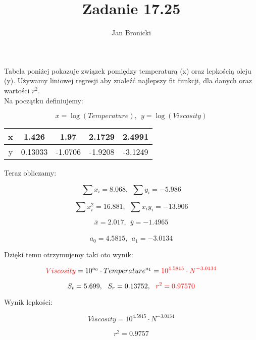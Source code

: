 \documentclass{article}
\title{Zadanie 17.25}
\author{Jan Bronicki}
\date{}
\begin{document}
\maketitle
Tabela poniżej pokazuje związek pomiędzy temperaturą (x) oraz lepkością oleju (y). Używamy liniowej regresji aby znaleźć najlepszy fit funkcji, dla danych oraz wartości $r^{2}$.
\\
Na początku definiujemy:

$$
    x = \log(Temperature), \ \ y = \log(Viscosity)
$$

\begin{center}
    \begin{tabular}{ c | c c c c}
        x & 1.426   & 1.97    & 2.1729  & 2.4991  \\
        \hline
        y & 0.13033 & -1.0706 & -1.9208 & -3.1249
    \end{tabular}
\end{center}

Teraz obliczamy:

$$
    \sum x_{i} = 8.068, \ \ \sum y_{i} = -5.986
$$

$$
    \sum x^{2}_{i} = 16.881, \ \ \sum x_{i}y_{i} = -13.906
$$

$$
    \bar{x} = 2.017, \ \ \bar{y} = -1.4965
$$
\\
$$
    a_{0} = 4.5815, \ \ a_{1} = -3.0134
$$


Dzięki temu otrzymujemy taki oto wynik:

$$
    \textcolor{red}{Viscosity} = 10^{a_{0}} \cdot Temperature^{a_{1}} = \textcolor{red}{10^{4.5815} \cdot N^{-3.0134}}
$$

$$
    S_{t} = 5.699, \ \ S_{r} = 0.13752, \ \ \textcolor{red}{r^{2} = 0.97570}
$$


Wynik lepkości:

$$
    Viscosity = 10^{4.5815} \cdot N^{-3.0134}
$$

$$
    r^{2} = 0.9757
$$
\end{document}
